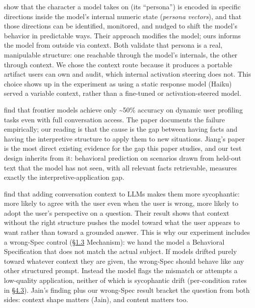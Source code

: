 \textbf{\citet{chen2025personavectors}} show that the character a model takes on (its
``persona'') is encoded in specific directions inside the model's
internal numeric state (\emph{persona vectors}), and that those
directions can be identified, monitored, and nudged to shift the model's
behavior in predictable ways. Their approach modifies the model; ours
informs the model from outside via context. Both validate that persona
is a real, manipulable structure: one reachable through the model's
internals, the other through context. We chose the context route because
it produces a portable artifact users can own and audit, which internal
activation steering does not. This choice shows up in the experiment as
using a static response model (Haiku) served a variable context, rather
than a fine-tuned or activation-steered model.

\textbf{\citet{jiang2025knowme}} find that frontier
models achieve only \textasciitilde50\% accuracy on dynamic user
profiling tasks even with full conversation access. The paper documents
the failure empirically; our reading is that the cause is the gap
between having facts and having the interpretive structure to apply them
to new situations. Jiang's paper is the most direct existing evidence
for the gap this paper studies, and our test design inherits from it:
behavioral prediction on scenarios drawn from held-out text that the
model has not seen, with all relevant facts retrievable, measures
exactly the interpretive-application gap.

\textbf{\citet{jain2025sycophancy}} find that adding
conversation context to LLMs makes them more sycophantic: more likely to
agree with the user even when the user is wrong, more likely to adopt
the user's perspective on a question. Their result shows that context
without the right structure pushes the model toward what the user
appears to want rather than toward a grounded answer. This is why our
experiment includes a wrong-Spec control (\hyperref[what-we-found]{§1.3} Mechanism): we hand the
model a Behavioral Specification that does not match the actual subject.
If models drifted purely toward whatever context they are given, the
wrong-Spec should behave like any other structured prompt. Instead the
model flags the mismatch or attempts a low-quality application, neither
of which is sycophantic drift (per-condition rates in \hyperref[mechanism-correct-content-not-format]{§4.3}). Jain's
finding plus our wrong-Spec result bracket the question from both sides:
context shape matters (Jain), and content matters too.

